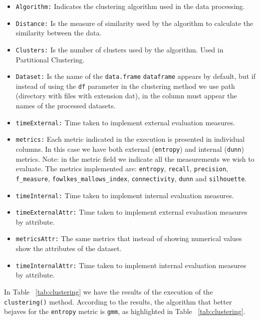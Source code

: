 \begin{itemize}
  \item \texttt{Algorithm:} Indicates the clustering algorithm used in the data processing.
  \item \texttt{Distance:} Is the measure of similarity used by the algorithm to calculate the similarity between the data.
  \item \texttt{Clusters:} Is the number of clusters used by the algorithm. Used in Partitional Clustering.
  \item \texttt{Dataset:} Is the name of the \texttt{data.frame} \texttt{dataframe} appears by default, but if instead of using the \texttt{df} parameter in the clustering method we use path (directory with files with extension dat), in the column must appear the names of the processed datasets.
  \item \texttt{timeExternal:} Time taken to implement external evaluation measures.
  \item \texttt{metrics:} Each metric indicated in the execution is presented in individual columns. In this case we have both external (\texttt{entropy}) and internal (\texttt{dunn}) metrics.
  Note: in the metric field we indicate all the measurements we wish to evaluate. The metrics implemented are: \texttt{entropy}, \texttt{recall}, \texttt{precision}, \texttt{f\_measure}, \texttt{fowlkes\_mallows\_index}, \texttt{connectivity}, \texttt{dunn} and \texttt{silhouette}.
  \item \texttt{timeInternal:} Time taken to implement internal evaluation measures.
  \item \texttt{timeExternalAttr:} Time taken to implement external evaluation measures by attribute.
  \item \texttt{metricsAttr:} The same metrics that instead of showing numerical values show the attributes of the dataset.
  \item \texttt{timeInternalAttr:} Time taken to implement internal evaluation measures by attribute.
\end{itemize}
In Table ~\ref{tab:clustering} we have the results of the execution of the \texttt{clustering()} method. According to the results, the algorithm that better bejaves for the \texttt{entropy} metric is \texttt{gmm}, as highlighted in Table ~\ref{tab:clustering}.
\clearpage
